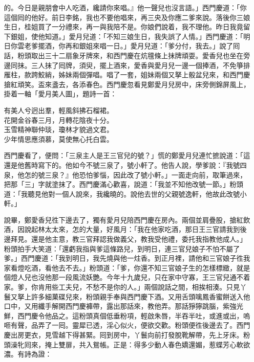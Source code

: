 的。今日是親朋會中人吃酒，纔請你來唱。』他一聲兒也沒言語。」西門慶道：「你這個囘的他好。前日李銘，我也不要他唱來，再三央及你應二爹來說。落後你三娘生日，桂姐買了一分禮來，再一與我陪不是。你娘們說着，我不理他。昨日我竟留下銀姐，使他知道。」愛月兒道：「不知三娘生日，我失誤了人情。」西門慶道：「明日你雲老爹擺酒，你再和銀姐來唱一日。」愛月兒道：「爹分付，我去。」說了囘話，粉頭取出三十二扇象牙牌來，和西門慶在炕氊條上抹牌頑耍。愛香兒也坐在旁邊同抹。三人抹了囘牌，須臾，擺上酒來，愛香與愛月兒一邊一個捧酒，不免箏排雁柱，款跨鮫綃，姊妹兩個彈唱。唱了一套，姐妹兩個又拏上骰盆兒來，和西門慶搶紅頑笑。盃來盞去，各添春色。西門慶忽看見鄭愛月兒房中，床旁側錦屏風上，掛着一軸「愛月美人圖」，題詩一首：

\begin{myquote} 
有美人兮迥出羣，輕風斜拂石榴裙。\\花開金谷春三月，月轉花陰夜十分。\\玉雪精神聯仲琰，瓊林才貌過文君。\\少年情思應須慕，莫使無心托白雲。{}

\end{myquote} 

西門慶看了，便問：「三泉主人是王三官兒的號？」慌的鄭愛月兒連忙摭說道：「這還是他舊時寫下的。他如今不號三泉了，號小軒了。{}他告人說，學爹說：『我號四泉，他怎的號三泉？』他恐怕爹惱，因此改了號小軒。」一面走向前，取筆過來，把那「三」字就塗抹了。西門慶滿心歡喜，{}說道：「我並不知他改號一節。」粉頭道：「我聽見他對一個人說來，我纔曉的。說他去世的父親號逸軒，他故此改號小軒。」

說畢，鄭愛香兒徃下邊去了，獨有愛月兒陪西門慶在房內。兩個並肩疊股，搶紅飲酒，因說起林太太來，怎的大量，好風月：「我在他家吃酒，那日王三官請我到後邊拜見。還是他主意，教三官拜認我做義父，教我受他禮，委托我指教他成人。」{}粉頭拍手大笑道：「還虧我指與爹這條路兒，到明日，連三官兒娘子不怕不屬了爹。」{}西門慶道：「我到明日，我先燒與他一炷香。到正月裡，請他和三官娘子徃我家看燈吃酒，看他去不去。」粉頭道：「爹，你還不知三官娘子生的怎樣標緻，就是個燈人兒也沒他那一段風流妖艷。今年十九歲兒，只在家中守寡，王三官兒通不着家。{}爹，你肯用些工夫兒，不愁不是你的人。」兩個說話之間，相挨相湊。只見丫鬟又拏上許多細菓碟兒來，粉頭親手奉與西門慶下酒。又用舌頭噙鳳香蜜餅送入他口中，又用纖手解開西門慶褲帶，露出那話來，教他弄。那話猙獰跳腦，紫強光鮮，西門慶令他品之。這粉頭真個低垂粉項，輕啟朱唇，半吞半吐，或進或出，嗚咂有聲，品弄了一囘。靈犀已透，淫心似火，便欲交歡。粉頭便徃後邊去了。西門慶出房更衣，見雪越下得甚緊。囘到房中，丫鬟向前打發脫靴解帶，先上牙床。粉頭澡牝囘來，掩上雙扉，共入鴛帳。正是：得多少動人春色嬌還媚，惹蝶芳心軟欲濃。有詩為證：

